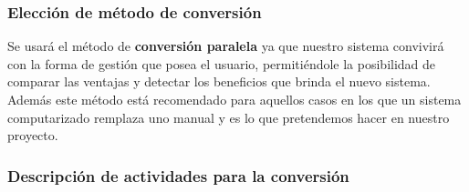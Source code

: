 \subsubsection{Elección de método de conversión}

Se usará el método de \textbf{conversión paralela} ya que nuestro sistema convivirá con la forma de gestión que posea el usuario, permitiéndole la posibilidad  de comparar las ventajas y detectar los beneficios que brinda el nuevo sistema.
Además este método está recomendado para aquellos casos en los que un sistema computarizado remplaza uno manual y es lo que pretendemos hacer en nuestro proyecto.

\subsubsection{Descripción de actividades para la conversión}

